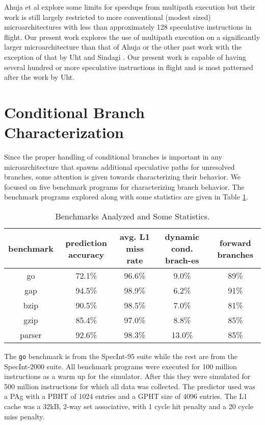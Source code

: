 \documentclass[10pt,dvips]{article}
\begin{document}
Ahuja et al \cite{Ahuja98} explore some limits for speedups from
multipath execution but their work is still largely restricted to more
conventional (modest sized) microarchitectures with less than approximately
128
speculative instructions in flight.  Our present work explores the use
of multipath execution on a significantly larger microarchitecture than
that of Ahuja or the other past work with the exception of that by
Uht and 
Sindagi \cite{Uht95}.
Our present work is capable of having several hundred or more
speculative instructions in flight and is most patterned after the
work by Uht.
%
\section{Conditional Branch Characterization}
%
Since the proper handling of conditional branches is important
in any microarchitecture that spawns additional speculative
paths for unresolved branches, some attention is given
towards characterizing their behavior.  
We focused
on five benchmark programs for characterizing branch behavior.
The benchmark programs explored along with some statistics 
are given in Table \ref{tab:benches}.

\begin{table}
\begin{center}
\caption{Benchmarks Analyzed and Some Statistics.}\label{tab:benches}
\begin{tabular}{|c|c|c|c|c|}
\hline 
benchmark&
prediction accuracy&
avg. L1 miss rate&
dynamic cond. brach-es & forward branches\\
\hline
\hline 
go&
72.1\%&
96.6\%&
9.0\% & 89\%\\
\hline 
gap&
94.5\%&
98.9\%&
6.2\% & 91\%\\
\hline 
bzip&
90.5\%&
98.5\%&
7.0\%&81\%\\
\hline 
gzip&
85.4\%&
97.0\%&
8.8\%&85\%\\
\hline 
parser&
92.6\%&
98.3\%&
13.0\%&85\%\\
\hline
\end{tabular}
\end{center}
\end{table}

The {\tt go} benchmark is from the SpecInt-95 suite while the rest
are from the SpecInt-2000 suite.
All benchmark programs were executed for 100 million instructions
as a warm up for the simulator.  After this they were simulated
for 500 million instructions for which all data was collected.
The predictor used was a PAg with
a PBHT of 1024 entries and a GPHT size of 4096 entries.
The L1 cache was a 32kB, 2-way set associative, with 1 cycle hit
penalty and a 20 cycle miss penalty.
\end{document}
